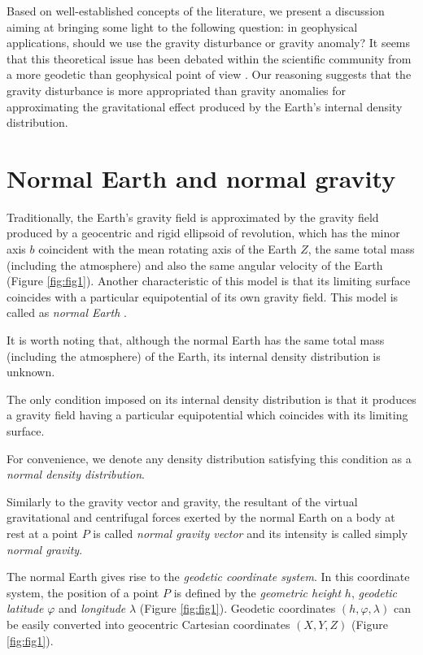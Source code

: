 \documentclass[extra]{gji}
\begin{document}
Based on well-established concepts of the literature,
we present a discussion aiming at bringing some
light to the following question: in geophysical applications,
should we use the gravity disturbance or gravity anomaly?
It seems that this theoretical issue has been 
debated within the scientific community from a 
more geodetic than geophysical point of view
\citep{lafehr1991,chapin1996,li2001,fairhead2003,
hackney-featherstone2003,hinze2005}.
Our reasoning suggests that the gravity 
disturbance is more appropriated than gravity anomalies for 
approximating the gravitational effect produced by the Earth's 
internal density distribution.

\section{Normal Earth and normal gravity}


Traditionally, the Earth's gravity field is approximated 
by the gravity field produced by a geocentric and rigid ellipsoid 
of revolution, which has the minor axis $b$ 
coincident with the mean rotating axis of the Earth $Z$, the 
same total mass (including the atmosphere) and also the
same angular velocity of the Earth (Figure \ref{fig:fig1}).
Another characteristic of this model is that its
limiting surface coincides with a particular equipotential 
of its own gravity field.
This model is called as \textit{normal Earth} 
\citep{heiskanen-moritz1967,vanicek1987,hofmann-wellenhof-moritz2005,
torge2012}.


It is worth noting that, although the normal Earth has the
same total mass (including the atmosphere) of the Earth,
its internal density distribution is unknown.


The only condition imposed on its internal density
distribution is that it produces a gravity field
having a particular equipotential which coincides
with its limiting surface.


For convenience, we denote any density distribution 
satisfying this condition as a \textit{normal density distribution}.


Similarly to the gravity vector and gravity, 
the resultant of the virtual 
gravitational and centrifugal forces exerted by the normal
Earth on a body at rest at a point $P$ is called 
\textit{normal gravity vector} and its intensity is called 
simply \textit{normal gravity}.


The normal Earth gives rise to the \textit{geodetic coordinate system}.
In this coordinate system, the position of a point $P$
is defined by the \textit{geometric height} $h$, 
\textit{geodetic latitude}
$\varphi$ and \textit{longitude} $\lambda$ (Figure \ref{fig:fig1}).
Geodetic coordinates $(h, \varphi, \lambda)$ can be easily 
converted into geocentric Cartesian coordinates $(X, Y, Z)$
(Figure \ref{fig:fig1}).
\end{document}
